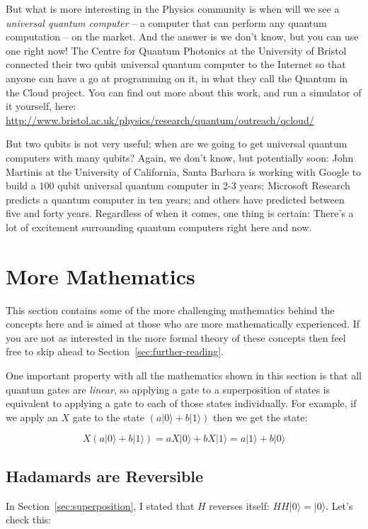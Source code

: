 \documentclass[twocolumn]{article}
\begin{document}
But what is more interesting in the Physics community is when will we see a {\em universal quantum computer} -- a computer that can perform any quantum computation -- on the market. And the answer is we don't know, but you can use one right now! The Centre for Quantum Photonics at the University of Bristol connected their two qubit universal quantum computer to the Internet so that anyone can have a go at programming on it, in what they call the Quantum in the Cloud project. You can find out more about this work, and run a simulator of it yourself, here: \url{http://www.bristol.ac.uk/physics/research/quantum/outreach/qcloud/}

But two qubits is not very useful; when are we going to get universal quantum computers with many qubits? Again, we don't know, but potentially soon: John Martinis at the University of California, Santa Barbara is working with Google to build a $100$ qubit universal quantum computer in 2-3 years; Microsoft Research predicts a quantum computer in ten years; and others have predicted between five and forty years. Regardless of when it comes, one thing is certain: There's a lot of excitement surrounding quantum computers right here and now.

\section{More Mathematics}

This section contains some of the more challenging mathematics behind the concepts here and is aimed at those who are more mathematically experienced. If you are not as interested in the more formal theory of these concepts then feel free to skip ahead to Section~\ref{sec:further-reading}.

One important property with all the mathematics shown in this section is that all quantum gates are {\em linear}, so applying a gate to a superposition of states is equivalent to applying a gate to each of those states individually. For example, if we apply an $X$ gate to the state $(a|0\rangle + b|1\rangle)$ then we get the state:

$$X(a|0\rangle + b|1\rangle) = aX|0\rangle + bX|1\rangle = a|1\rangle + b|0\rangle$$

\subsection{Hadamards are Reversible}
\label{subsec:maths-hadamard}

In Section~\ref{sec:superposition}, I stated that $H$ reverses itself: $HH|0\rangle = |0\rangle$. Let's check this:
\end{document}
